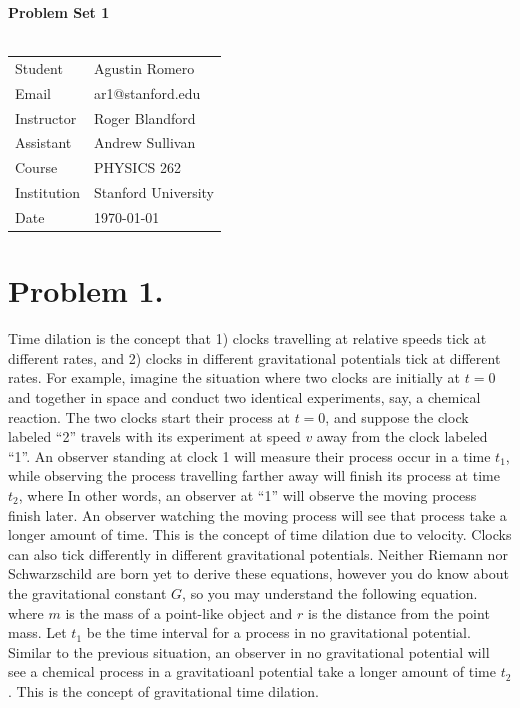 \documentclass{article}
\begin{document}
\begin{center}
\textbf{\Large{Problem Set 1}}\\~\\
\begin{tabular}{l l}
Student&Agustin Romero\\
Email&ar1@stanford.edu\\
Instructor&Roger Blandford\\
Assistant&Andrew Sullivan\\
Course&PHYSICS 262\\
Institution&Stanford University\\
Date&\today\\
\end{tabular}
\end{center}
\section*{Problem 1.}
Time dilation is the concept that 1) clocks travelling at relative speeds tick at different rates, and 2) clocks in different gravitational potentials tick at different rates. For example, imagine the situation where two clocks are initially at $t=0$ and together in space and conduct two identical experiments, say, a chemical reaction. The two clocks start their process at $t=0$, and suppose the clock labeled ``2'' travels with its experiment at speed $v$ away from the clock labeled ``1''. An observer standing at clock 1 will measure their process occur in a time $t_1$, while observing the process travelling farther away will finish its process at time $t_2$,
where
In other words, an observer at ``1'' will observe the moving process finish later. An observer watching the moving process will see that process take a longer amount of time. This is the concept of time dilation due to velocity. Clocks can also tick differently in different gravitational potentials. Neither Riemann nor Schwarzschild are born yet to derive these equations, however you do know about the gravitational constant $G$, so you may understand the following equation.
where $m$ is the mass of a point-like object and $r$ is the distance from the point mass. Let $t_1$ be the time interval for a process in no gravitational potential. Similar to the previous situation, an observer in no gravitational potential will see a chemical process in a gravitatioanl potential take a longer amount of time $t_2$. This is the concept of gravitational time dilation.\\~\\
\end{document}
